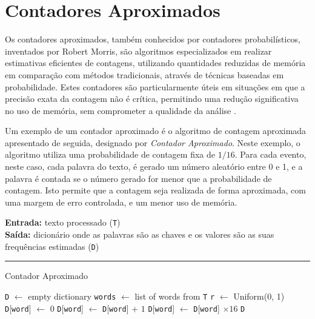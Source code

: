 \documentclass[mirror, portugues]{revdetua}
\begin{document}
\section{Contadores Aproximados}

Os contadores aproximados, também conhecidos por contadores probabilísticos, inventados por Robert Morris, são algoritmos especializados em realizar estimativas eficientes de contagens, utilizando quantidades reduzidas de memória em comparação com métodos tradicionais, através de técnicas baseadas em probabilidade. Estes contadores são particularmente úteis em situações em que a precisão exata da contagem não é crítica, permitindo uma redução significativa no uso de memória, sem comprometer a qualidade da análise \cite{RM78}.

Um exemplo de um contador aproximado é o algoritmo de contagem aproximada apresentado de seguida, designado por \textit{Contador Aproximado}. Neste exemplo, o algoritmo utiliza uma probabilidade de contagem fixa de $1/16$. Para cada evento, neste caso, cada palavra do texto, é gerado um número aleatório entre 0 e 1, e a palavra é contada se o número gerado for menor que a probabilidade de contagem. Isto permite que a contagem seja realizada de forma aproximada, com uma margem de erro controlada, e um menor uso de memória.

\begin{algorithm}[H]
\raggedright
\textbf{Entrada:} texto processado (\texttt{T}) \\
\textbf{Saída:} dicionário onde as palavras são as chaves e os valores são as suas frequências estimadas (\texttt{D})\\
\hrule 
\caption{Contador Aproximado}
\begin{algorithmic}[1]
    \State \texttt{D} $\gets$ empty dictionary
    \State \texttt{words} $\gets$ list of words from \texttt{T}
    \State \texttt{r} $\gets$ Uniform(0, 1)
            \State \texttt{D}[\texttt{word}] $\gets$ 0
        \EndIf
        \State \texttt{D}[\texttt{word}] $\gets$ \texttt{D}[\texttt{word}] + $1$
    \EndIf
    \EndFor
     
    \State \texttt{D}[\texttt{word}] $\gets$ \texttt{D}[\texttt{word}] $\times 16$
    \EndFor
    \State \Return \texttt{D}
\end{algorithmic}
\end{algorithm}
\end{document}
